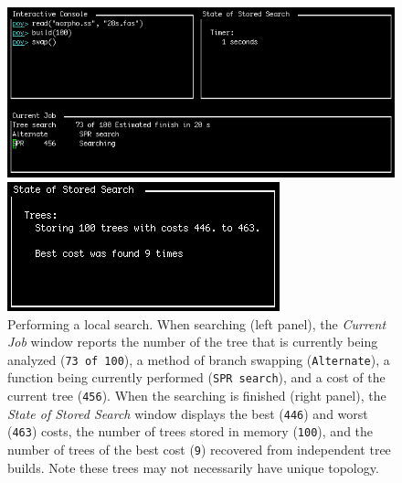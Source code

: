 \begin{figure}
\centering
\begin{minipage}[c]{0.49\textwidth}
   		\includegraphics[width=\textwidth]{figures/swap1.jpg}
\end{minipage}
\quad
\begin{minipage}[c]{0.453\textwidth}
	   	\includegraphics[width=\textwidth]{figures/swap2.jpg}
   	\end{minipage}
\caption{Performing a local search. When searching (left panel), the \emph{Current Job} window reports the number of the tree that is currently being analyzed (\texttt{73 of 100}), a method of branch swapping (\texttt{Alternate}), a function being currently performed (\texttt{SPR search}), and a cost of the current tree (\texttt{456}). When the searching is finished (right panel), the \emph{State of Stored Search} window displays the best (\texttt{446}) and worst (\texttt{463}) costs, the number of trees stored in memory (\texttt{100}), and the number of trees of the best cost (\texttt{9}) recovered from independent tree builds. Note these trees may not necessarily have unique topology.} 
\label{fig:swapping}
\end{figure}

